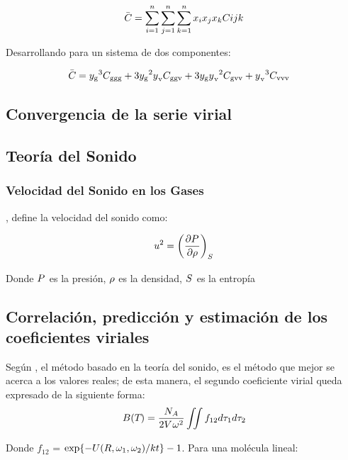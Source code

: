 \begin{equation}
  \eqThirdVirialCoeffSum{}
\end{equation}

Desarrollando para un sistema de dos componentes:

\begin{equation}
  \thirdVirialCoeffDevelop{}
\end{equation}

\namingEqThirdVirialCoeff{}

\figVirialBCBehavior

\subsection{Convergencia de la serie virial}

\subsection{Teoría del Sonido}
\subsubsection*{Velocidad del Sonido en los Gases}

\parencite[p. 186]{Wilhelm2010}, define la velocidad del sonido como:

\begin{align}
  \label{cap:subsec:velocidadSonido}
  \SoundSpeed{}
\end{align}

Donde $\pressure$  es la presión, $\density$ es la densidad, $\entropy$ es la entropía

\subsection{Correlación, predicción y estimación de los coeficientes viriales}
\label{cap2:subsec:tagEqnPredict}




Según \parencite[ p. 12]{Dymond2002}, el método basado en la teoría del sonido, es el método que mejor se acerca a los valores reales; de esta manera, el segundo coeficiente virial queda expresado de la siguiente forma:
\begin{equation}
  \eqSndVirialCoeff{1}{2}{\temperatureAbsolute}
\end{equation}


Donde $f_{12}$ = $ \ce{exp}{\{-U(R, \omega_1 , \omega_2)/kt\}} - 1 $. Para una molécula lineal:

